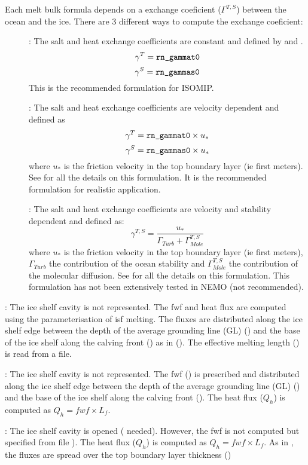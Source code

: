 \documentclass[../main/NEMO_manual]{subfiles}
\begin{document}
\begin{description}
     Each melt bulk formula depends on a exchange coeficient ($\Gamma^{T,S}$) between the ocean and the ice. 
     There are 3 different ways to compute the exchange coeficient:
	\begin{description}
        \item[]:
     The salt and heat exchange coefficients are constant and defined by  and . 
\[
\gamma^{T} = \np{rn\_gammat0}
\]
\[
\gamma^{S} = \np{rn\_gammas0}
\]
     This is the recommended formulation for ISOMIP.
	\item[]:
     The salt and heat exchange coefficients are velocity dependent and defined as
\[
\gamma^{T} = \np{rn\_gammat0} \times u_{*} 
\]
\[
\gamma^{S} = \np{rn\_gammas0} \times u_{*}
\]
     where $u_{*}$ is the friction velocity in the top boundary layer (ie first  meters).
     See \citet{Jenkins2010} for all the details on this formulation. It is the recommended formulation for realistic application.
	\item[]:
     The salt and heat exchange coefficients are velocity and stability dependent and defined as:
\[
\gamma^{T,S} = \frac{u_{*}}{\Gamma_{Turb} + \Gamma^{T,S}_{Mole}} 
\]
     where $u_{*}$ is the friction velocity in the top boundary layer (ie first  meters),
     $\Gamma_{Turb}$ the contribution of the ocean stability and
     $\Gamma^{T,S}_{Mole}$ the contribution of the molecular diffusion.
     See \citet{Holland1999} for all the details on this formulation. 
     This formulation has not been extensively tested in NEMO (not recommended).
   \end{description}
 \item[\np{nn\_isf}\forcode{ = 2}]:
   The ice shelf cavity is not represented.
   The fwf and heat flux are computed using the \citet{Beckmann2003} parameterisation of isf melting.
   The fluxes are distributed along the ice shelf edge between the depth of the average grounding line (GL)
   () and the base of the ice shelf along the calving front
   () as in ().
   The effective melting length () is read from a file.
 \item[\np{nn\_isf}\forcode{ = 3}]:
   The ice shelf cavity is not represented.
   The fwf () is prescribed and distributed along the ice shelf edge between
   the depth of the average grounding line (GL) () and
   the base of the ice shelf along the calving front ().
   The heat flux ($Q_h$) is computed as $Q_h = fwf \times L_f$.
 \item[\np{nn\_isf}\forcode{ = 4}]:
   The ice shelf cavity is opened ( needed).
   However, the fwf is not computed but specified from file ).
   The heat flux ($Q_h$) is computed as $Q_h = fwf \times L_f$.
   As in , the fluxes are spread over the top boundary layer thickness ()\\
\end{description}
\end{document}
